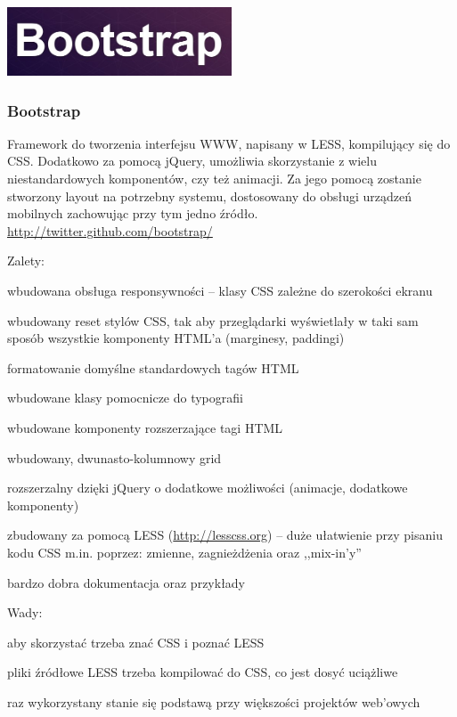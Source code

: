 \begin{minipage}{\textwidth}
    \begin{center}
        \includegraphics[width=0.5\textwidth]{img/logos/bootstrap.jpg}
    \end{center}
    \subsubsection{Bootstrap}
Framework do tworzenia interfejsu WWW, napisany w LESS, kompilujący się do CSS. Dodatkowo za pomocą jQuery, umożliwia skorzystanie z wielu niestandardowych komponentów, czy też animacji. Za jego pomocą zostanie stworzony layout na potrzebny systemu, dostosowany do obsługi urządzeń mobilnych zachowując przy tym jedno źródło. \url{http://twitter.github.com/bootstrap/}

    Zalety:
    \begin{packed_item}
        \item{wbudowana obsługa responsywności -- klasy CSS zależne do szerokości ekranu}
        \item{wbudowany reset stylów CSS, tak aby przeglądarki wyświetlały w taki sam sposób wszystkie komponenty HTML'a (marginesy, paddingi)}
        \item{formatowanie domyślne standardowych tagów HTML}
        \item{wbudowane klasy pomocnicze do typografii}
        \item{wbudowane komponenty rozszerzające tagi HTML}
        \item{wbudowany, dwunasto-kolumnowy grid}
        \item{rozszerzalny dzięki jQuery o dodatkowe możliwości (animacje, dodatkowe komponenty)}
        \item{zbudowany za pomocą LESS (\url{http://lesscss.org}) -- duże ułatwienie przy pisaniu kodu CSS m.in. poprzez: zmienne, zagnieżdżenia oraz ,,mix-in'y''}
        \item{bardzo dobra dokumentacja oraz przykłady}
    \end{packed_item}

    Wady:
    \begin{packed_item}
        \item{aby skorzystać trzeba znać CSS i poznać LESS}
        \item{pliki źródłowe LESS trzeba kompilować do CSS, co jest dosyć uciążliwe}
        \item{raz wykorzystany stanie się podstawą przy większości projektów web'owych}
    \end{packed_item}


\end{minipage}
